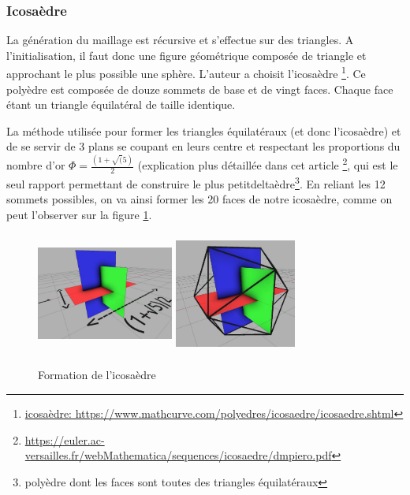 	\subsubsection{Icosaèdre}
	\label{subsec:icosaèdre}
	
	La génération du maillage est récursive et s'effectue sur des triangles. A l'initialisation, il faut donc une figure géométrique composée de triangle et approchant le plus possible une sphère. L'auteur a choisit l'icosaèdre \footnote{\url{icosaèdre: https://www.mathcurve.com/polyedres/icosaedre/icosaedre.shtml}}. Ce polyèdre est composée de douze sommets de base et de vingt faces. Chaque face étant un triangle équilatéral de taille identique.
	
	La méthode utilisée pour former les triangles équilatéraux (et donc l'icosaèdre) et de se servir de 3 plans se coupant en leurs centre et respectant les proportions du nombre d'or $\Phi = \frac{(1+\sqrt(5)}{2}$ (explication plus détaillée dans cet article \footnote{\url{https://euler.ac-versailles.fr/webMathematica/sequences/icosaedre/dmpiero.pdf}}, qui est le seul rapport permettant de construire le plus petitdeltaèdre\footnote{polyèdre dont les faces sont toutes des triangles équilatéraux}. En reliant les 12 sommets possibles, on va ainsi former les 20 faces de notre icosaèdre, comme on peut l'observer sur la figure \ref{fig:plans-icosaèdre}.
	
	\begin{figure}[H]
        \centerline{
            \includegraphics[height=4cm,width=4.5cm]{img/3plans.png}
            \includegraphics[height=4cm,width=4cm]{img/3plans2.png}}
        \caption{Formation de l'icosaèdre \protect\footnotemark}
        \label{fig:plans-icosaèdre}
	\end{figure}
	
